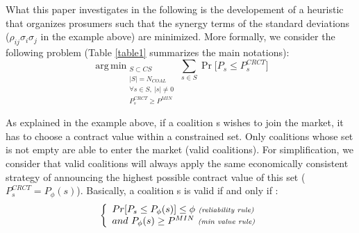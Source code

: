 \documentclass[conference]{IEEEtran}
\DeclareMathOperator*{\argmin}{arg\,min}
\begin{document}
What this paper investigates in the following is the developement of a heuristic that organizes prosumers such that the synergy terms of the standard deviations ($ \rho_{ij}\sigma_{i}\sigma_{j} $ in the example above) are minimized. More formally, we consider the following problem (Table \ref{table1} summarizes the main notations):
 \begin{equation}
  \argmin _{\substack{ S \subset CS \\ 
                      |S| = N_{COAL} \\ 
                      \forall s \in S,\ |s| \neq 0 
                      \\ P_{s}^{CRCT} \geq P^{MIN}}}
   \sum_{s \in S}  \Pr \bigl[ P_{s} \leq P_{s}^{CRCT} \bigr]
  \label{problem}
\end{equation}  

As explained in the example above, if a coalition s wishes to join the market, it has to choose a contract value within a constrained set. Only coalitions whose set is not empty are able to enter the market (valid coalitions). For simplification, we consider that valid coalitions will always apply the same economically consistent strategy of announcing the highest possible contract value of this set ( $ P_{s}^{CRCT} = P_{\phi}(s) $).
Basically, a coalition s is valid if and only if :
\begin{equation}
\left\{ \begin{array}{lll}
		Pr[ P_{s} \leq P_{\phi}(s)] \leq \phi\ \textit{{\scriptsize (reliability rule)}} \\
		and\ P_{\phi}(s) \geq P^{MIN}\ \textit{{\scriptsize (min value rule)}}

\end{array} \right. 
\label{rules}
\end{equation}
\end{document}

